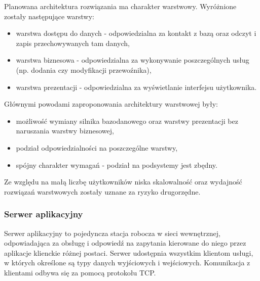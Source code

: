 \documentclass[10pt,a4paper]{article}
\begin{document}
Planowana architektura rozwiązania ma charakter warstwowy. Wyróżnione zostały następujące warstwy:
\begin{itemize}
	\item warstwa dostępu do danych - odpowiedzialna za kontakt z bazą oraz odczyt i zapis przechowywanych tam danych,
	\item warstwa biznesowa - odpowiedzialna za wykonywanie poszczególnych usług (np. dodania czy modyfikacji przewoźnika),
	\item warstwa prezentacji - odpowiedzialna za wyświetlanie interfejsu użytkownika.
	\end{itemize}
	Głównymi powodami zaproponowania architektury warstwowej były:
	\begin{itemize}
	\item możliwość wymiany silnika bazodanowego oraz warstwy prezentacji bez naruszania warstwy biznesowej,
	\item podział odpowiedzialności na poszczególne warstwy,
	\item spójny charakter wymagań - podział na podsystemy jest zbędny.
\end{itemize}
Ze względu na małą liczbę użytkowników niska skalowalność oraz wydajność rozwiązań warstwowych zostały uznane za ryzyko drugorzędne.

\subsubsection{Serwer aplikacyjny}
Serwer aplikacyjny to pojedyncza stacja robocza w sieci wewnętrznej, odpowiadająca za obsługę i odpowiedź na zapytania kierowane do niego przez aplikacje klienckie różnej postaci. Serwer udostępnia wszystkim klientom usługi, w których określone są typy danych wyjściowych i wejściowych. Komunikacja z klientami odbywa się za pomocą protokołu TCP.
\end{document}
